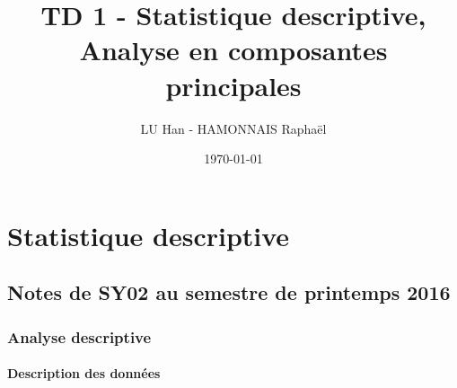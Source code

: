 \documentclass[a4paper,10pt]{report}
\title{TD 1 - Statistique descriptive, Analyse en composantes principales}
\author{LU Han - HAMONNAIS Raphaël}
\date{\today}
\begin{document}
\renewcommand{\labelitemi}{\large\textcolor{tatoebagreen}{\fg}}
\groovypdtitre
\restoregeometry %


\tableofcontents




\chapter{Statistique descriptive}

\section{Notes de SY02 au semestre de printemps 2016}

\subsection{Analyse descriptive}

\subsubsection{Description des données}
\end{document}
